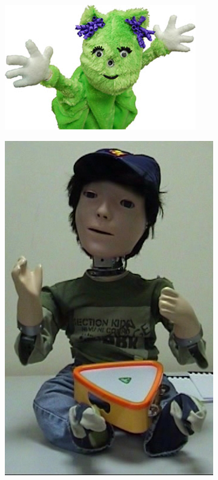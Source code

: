 \documentclass[a4paper,twoside]{book}
\begin{document}
\begin{figure}[bh]
\centering
\begin{subfigure}[b]{0.3\textwidth}
\includegraphics[width=\textwidth]{img/Cabibihan}
\end{subfigure}\quad
\begin{subfigure}[b]{0.3\textwidth}
\includegraphics[width=\textwidth]{img/Dautenhahn}

\end{subfigure}
\end{figure}
\end{document}
